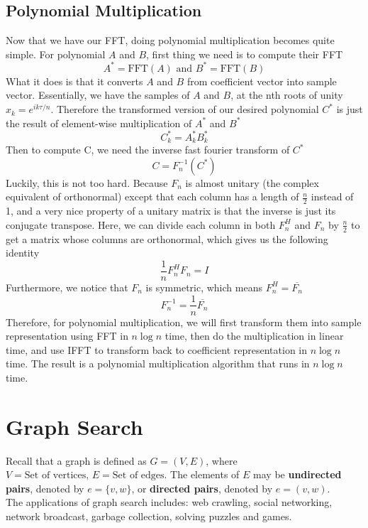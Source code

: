 \documentclass[a4paper]{article}
\renewcommand{\sb}{\vspace*{4px} \\}
\begin{document}
\subsection{Polynomial Multiplication}
Now that we have our FFT, doing polynomial multiplication becomes quite simple. For polynomial $A$ and $B$, first thing we need is to compute 
their FFT
\[ A^* = \text{FFT}(A) \text{  and  } B^* = \text{FFT}(B) \]
What it does is that it converts $A$ and $B$ from coefficient vector into sample vector. Essentially, we have the samples of $A$ and $B$, at 
the nth roots of unity $x_k = e^{ik\tau/n}$. Therefore the transformed version of our desired polynomial $C^*$ is just the result 
of element-wise multiplication of $A^*$ and $B^*$
\[ C_k^* = A_k^* B_k^* \]
Then to compute C, we need the inverse fast fourier transform of $C^*$
\[ C = F_n^{-1}(C^*) \]
Luckily, this is not too hard. Because $F_n$ is almost unitary (the complex equivalent of orthonormal) except that 
each column has a length of $\frac{n}{2}$ instead of 1, and a very nice property of a unitary matrix is that 
the inverse is just its conjugate transpose. Here, we can divide each column in both
$F_n^H$ and $F_n$ by $\frac{n}{2}$ to get a matrix whose columns are orthonormal, which gives us the following identity
\[ \frac{1}{n}F_n^H F_n = I \]
Furthermore, we notice that $F_n$ is symmetric, which means $F_n^H = \overline{F_n}$
\[ F_n^{-1} = \frac{1}{n} \overline{F_n} \]
Therefore, for polynomial multiplication, we will first transform them into sample representation using FFT in $n \log n$ time, then
do the multiplication in linear time, and use IFFT to transform back to coefficient representation in $n \log n$ time. The result 
is a polynomial multiplication algorithm that runs in $n \log n$ time.

\section{Graph Search}
Recall that a graph is defined as $G = (V, E)$, where $V = \text{Set of vertices, }
E = \text{Set of edges}$. The elements of $E$ may be \textbf{undirected pairs}, denoted by 
$e = \{v, w\}$, or \textbf{directed pairs}, denoted by $e = (v, w)$. \sb
The applications of graph search includes: web crawling, social networking, network 
broadcast, garbage collection, solving puzzles and games.
\end{document}
